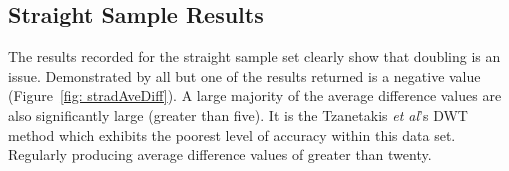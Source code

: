 \documentclass[a4paper, 11pt]{article}
\begin{document}




\subsection{Straight Sample Results}
The results recorded for the straight sample set clearly show that doubling is an issue. Demonstrated by all but one of the results returned is a negative value (Figure~\ref{fig: stradAveDiff}). A large majority of the average difference values are also significantly large (greater than five). It is the Tzanetakis \textit{et al}'s \cite{tzane1} DWT method which exhibits the poorest level of accuracy within this data set. Regularly producing average difference values of greater than twenty.\par
\end{document}
